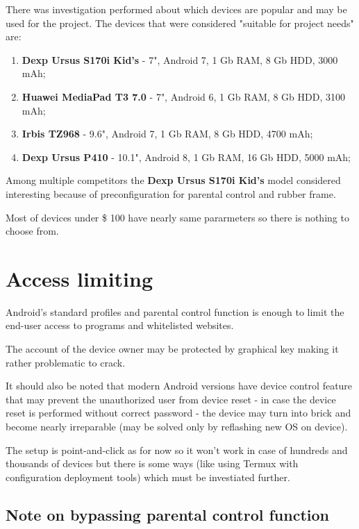 There was investigation performed about which devices are popular and
may be used for the project. The devices that were considered "suitable
for project needs" are:

\begin{enumerate}
\item \textbf{Dexp Ursus S170i Kid's} - 7", Android 7, 1 Gb RAM, 8 Gb HDD,
3000 mAh;
\item \textbf{Huawei MediaPad T3 7.0} - 7", Android 6, 1 Gb RAM, 8 Gb HDD, 3100 mAh;
\item \textbf{Irbis TZ968} - 9.6", Android 7, 1 Gb RAM, 8 Gb HDD, 4700 mAh;
\item \textbf{Dexp Ursus P410} - 10.1", Android 8, 1 Gb RAM, 16 Gb HDD,
5000 mAh;
\end{enumerate}

Among multiple competitors the \textbf{Dexp Ursus S170i Kid's} model
considered interesting because of preconfiguration for parental control
and rubber frame.

Most of devices under \$ 100 have nearly same pararmeters so there is
nothing to choose from.


\section{Access limiting}

Android's standard profiles and parental control function is enough to
limit the end-user access to programs and whitelisted websites.

The account of the device owner may be protected by graphical key
making it rather problematic to crack.

It should also be noted that modern Android versions have device control
feature that may prevent the unauthorized user from device reset -
in case the device reset is performed without correct password - the
device may turn into brick and become nearly irreparable (may be
solved only by reflashing new OS on device).

The setup is point-and-click as for now so it won't work in case of
hundreds and thousands of devices but there is some ways (like using
Termux with configuration deployment tools) which must be investiated
further.


\subsection{Note on bypassing parental control function}

